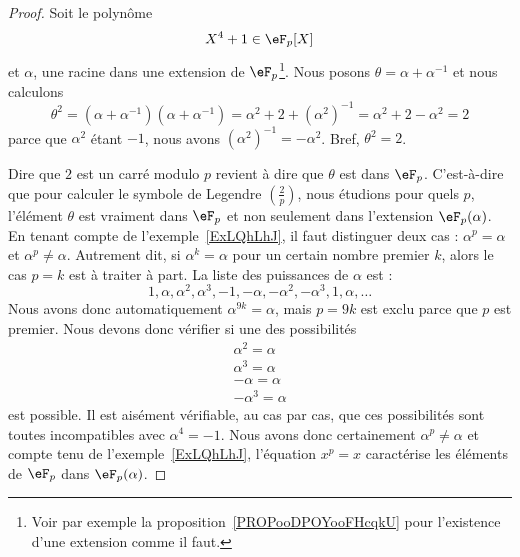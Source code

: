 \begin{proof}
    Soit le polynôme
    \begin{equation}
        X^4+1\in \eF_p[X]
    \end{equation}
    et \( \alpha\), une racine dans une extension de \( \eF_p\)\footnote{Voir par exemple la proposition~\ref{PROPooDPOYooFHcqkU} pour l'existence d'une extension comme il faut.}. Nous posons \( \theta=\alpha+\alpha^{-1}\) et nous calculons
    \begin{equation}
        \theta^2=(\alpha+\alpha^{-1})(\alpha+\alpha^{-1})=\alpha^2+2+(\alpha^2)^{-1}=\alpha^2+2-\alpha^2=2
    \end{equation}
    parce que \( \alpha^2\) étant \( -1\), nous avons \( (\alpha^2)^{-1}=-\alpha^2\). Bref, \( \theta^2=2\).

    Dire que \( 2\) est un carré modulo \( p\) revient à dire que \( \theta\) est dans \( \eF_p\). C'est-à-dire que pour calculer le symbole de Legendre \( \left(\frac{2}{p}\right)\), nous étudions pour quels \( p\), l'élément \( \theta\) est vraiment dans \( \eF_p\) et non seulement dans l'extension \( \eF_p(\alpha)\). En tenant compte de l'exemple~\ref{ExLQhLhJ}, il faut distinguer deux cas : \( \alpha^p=\alpha\) et \( \alpha^p\neq \alpha\). Autrement dit, si \( \alpha^k=\alpha\) pour un certain nombre premier \( k\), alors le cas \( p=k\) est à traiter à part. La liste des puissances de \( \alpha\) est :
    \begin{equation}
        1,\alpha,\alpha^2,\alpha^3,-1,-\alpha,-\alpha^2,-\alpha^3,1,\alpha,\ldots
    \end{equation}
    Nous avons donc automatiquement \( \alpha^{9k}=\alpha\), mais \( p=9k\) est exclu parce que \( p\) est premier. Nous devons donc vérifier si une des possibilités
    \begin{subequations}
        \begin{align}
            \alpha^2=\alpha\\
            \alpha^3=\alpha\\
            -\alpha=\alpha\\
            -\alpha^3=\alpha
        \end{align}
    \end{subequations}
    est possible. Il est aisément vérifiable, au cas par cas, que ces possibilités sont toutes incompatibles avec \( \alpha^4=-1\). Nous avons donc certainement \( \alpha^p\neq \alpha\) et compte tenu de l'exemple~\ref{ExLQhLhJ}, l'équation \( x^p=x\) caractérise les éléments de \( \eF_p\) dans \( \eF_p(\alpha)\).


\end{proof}
